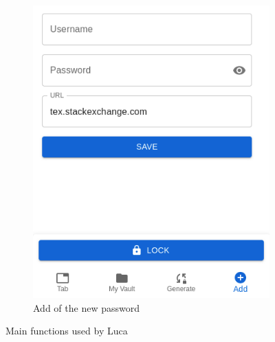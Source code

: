 \begin{enumerate}
\begin{figure}[H]
\begin{subfigure}{.5\textwidth}
			\centering
			\includegraphics[width=.6\linewidth]{images/extension/add.png}
			\caption{Add of the new password}
			\label{fig:sub2}
		\end{subfigure}
		\caption{Main functions used by Luca}
		\label{fig:test}
	\end{figure}


\end{enumerate}
